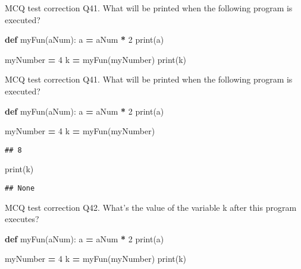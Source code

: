 \documentclass[
  8pt,
  ignorenonframetext,
]{beamer}
\newenvironment{Shaded}{\begin{snugshade}}{\end{snugshade}}
\newcommand{\BuiltInTok}[1]{#1}
\newcommand{\DecValTok}[1]{\textcolor[rgb]{0.00,0.00,0.81}{#1}}
\newcommand{\KeywordTok}[1]{\textcolor[rgb]{0.13,0.29,0.53}{\textbf{#1}}}
\newcommand{\NormalTok}[1]{#1}
\newcommand{\OperatorTok}[1]{\textcolor[rgb]{0.81,0.36,0.00}{\textbf{#1}}}
\begin{document}
\begin{frame}[fragile]{MCQ test correction}
\protect\hypertarget{mcq-test-correction-80}{}
Q41. What will be printed when the following program is executed?

\begin{Shaded}
\begin{Highlighting}[]
\KeywordTok{def}\NormalTok{ myFun(aNum):}
\NormalTok{    a }\OperatorTok{=}\NormalTok{ aNum }\OperatorTok{*} \DecValTok{2}
    \BuiltInTok{print}\NormalTok{(a)}

\NormalTok{myNumber }\OperatorTok{=} \DecValTok{4}
\NormalTok{k }\OperatorTok{=}\NormalTok{ myFun(myNumber)}
\BuiltInTok{print}\NormalTok{(k)}
\end{Highlighting}
\end{Shaded}
\end{frame}

\begin{frame}[fragile]{MCQ test correction}
\protect\hypertarget{mcq-test-correction-81}{}
Q41. What will be printed when the following program is executed?

\begin{Shaded}
\begin{Highlighting}[]
\KeywordTok{def}\NormalTok{ myFun(aNum):}
\NormalTok{    a }\OperatorTok{=}\NormalTok{ aNum }\OperatorTok{*} \DecValTok{2}
    \BuiltInTok{print}\NormalTok{(a)}

\NormalTok{myNumber }\OperatorTok{=} \DecValTok{4}
\NormalTok{k }\OperatorTok{=}\NormalTok{ myFun(myNumber)}
\end{Highlighting}
\end{Shaded}

\begin{verbatim}
## 8
\end{verbatim}

\begin{Shaded}
\begin{Highlighting}[]
\BuiltInTok{print}\NormalTok{(k)}
\end{Highlighting}
\end{Shaded}

\begin{verbatim}
## None
\end{verbatim}
\end{frame}

\begin{frame}[fragile]{MCQ test correction}
\protect\hypertarget{mcq-test-correction-82}{}
Q42. What's the value of the variable k after this program executes?

\begin{Shaded}
\begin{Highlighting}[]
\KeywordTok{def}\NormalTok{ myFun(aNum):}
\NormalTok{    a }\OperatorTok{=}\NormalTok{ aNum }\OperatorTok{*} \DecValTok{2}
    \BuiltInTok{print}\NormalTok{(a)}

\NormalTok{myNumber }\OperatorTok{=} \DecValTok{4}
\NormalTok{k }\OperatorTok{=}\NormalTok{ myFun(myNumber)}
\BuiltInTok{print}\NormalTok{(k)}
\end{Highlighting}
\end{Shaded}
\end{frame}
\end{document}
